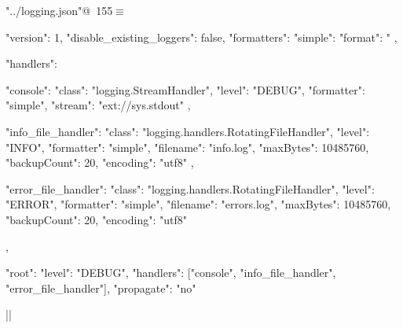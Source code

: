 \documentclass[%
    a4paper,    %
    justified,  %
    nobib,      %
    openany     %
]{tufte-book}
\begin{document}
\begin{flushleft} \small
\begin{minipage}{\linewidth}\label{scrap175}\raggedright\small
{} \verb@"../logging.json"@\nobreak\ {\footnotesize {155}}$\equiv$
\vspace{-1ex}
\begin{pythoncode}
{
    "version": 1,
    "disable_existing_loggers": false,
    "formatters": {
        "simple": {
            "format": "%
        }
    },

    "handlers": {
        "console": {
            "class": "logging.StreamHandler",
            "level": "DEBUG",
            "formatter": "simple",
            "stream": "ext://sys.stdout"
        },

        "info_file_handler": {
            "class": "logging.handlers.RotatingFileHandler",
            "level": "INFO",
            "formatter": "simple",
            "filename": "info.log",
            "maxBytes": 10485760,
            "backupCount": 20,
            "encoding": "utf8"
        },

        "error_file_handler": {
            "class": "logging.handlers.RotatingFileHandler",
            "level": "ERROR",
            "formatter": "simple",
            "filename": "errors.log",
            "maxBytes": 10485760,
            "backupCount": 20,
            "encoding": "utf8"
        }
    },

    "root": {
        "level": "DEBUG",
        "handlers": ["console", "info_file_handler", "error_file_handler"],
        "propagate": "no"
    }
}|\NWsep|
\end{pythoncode}
\vspace{1.5ex}
\footnotesize
\begin{list}{}{\setlength{\itemsep}{-\parsep}\setlength{\itemindent}{-\leftmargin}}

\item{}
\end{list}
\end{minipage}\vspace{4ex}
\end{flushleft}
\end{document}
